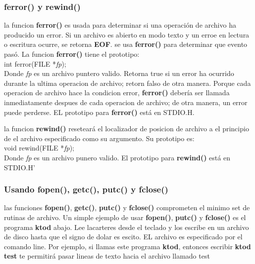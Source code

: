 \documentclass[]{article}
\begin{document}
	\subsubsection{ferror() y rewind()}
	
	la funcion \textbf{ferror()} es usada para determinar si una operación de archivo ha producido un error. Si un archivo es abierto en modo texto y un erroe en lectura o escritura ocurre, se retorna \textbf{EOF}. se usa \textbf{ferror()} para determinar que evento pasó. La funcion \textbf{ferror()} tiene el prototipo:\\
	
	int ferror(FILE *\textit{fp});\\
	
	Donde \textit{fp} es un archivo puntero valido. Retorna true si un error ha ocurrido durante la ultima operacion de archivo; retorn falso de otra manera. Porque cada operacion de archivo hace la condicion error, \textbf{ferror()} debería ser llamada inmediatamente despues de cada operacion de archivo; de otra manera, un error puede perderse. EL prototipo para \textbf{ferror()} está en STDIO.H.
	
	la funcion \textbf{rewind()} reseteará el localizador de posicion de archivo a el principio de el archivo especificado como su argumento. Su prototipo es:\\
	
	void rewind(FILE *\textit{fp});\\
	
	Donde \textit{fp} es un archivo punero valido. El prototipo para \textbf{rewind()} está en STDIO.H'
	
	\subsubsection{Usando fopen(), getc(), putc() y fclose()}
	
	las funciones \textbf{fopen()}, \textbf{getc()}, \textbf{putc()} y \textbf{fclose()} comprometen el minimo set de rutinas de archivo. Un simple ejemplo de usar \textbf{fopen()}, \textbf{putc()} y \textbf{fclose()} es el programa \textbf{ktod} abajo. Lee lacarteres desde el teclado y los escribe en un archivo de disco hasta que el signo de dolar es escito. EL archivo es especificado por el comando line. Por ejemplo, si llamas este programa \textbf{ktod}, entonces escribir \textbf{ktod test} te permitirá pasar lineas de texto hacia el archivo llamado test\\
	
\end{document}
